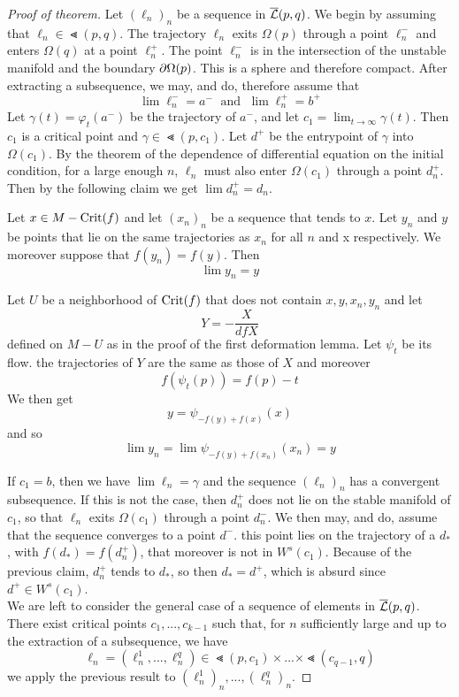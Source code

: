 \begin{proof}[Proof of theorem]
    Let $(\ell_n)_n$ be a sequence in ${\overline{\mathcal{L}} }(p, q)$.
    We begin by assuming that $\ell_n \in \Lt(p, q)$. The trajectory $\ell_n$ exits 
    $\Omega(p)$ through a point $\ell_n^-$ and enters $\Omega(q)$ at a point $\ell_n^+$.
    The point $\ell_n^-$ is in the intersection of the unstable manifold and the boundary
    ${ \partial } \Omega (p)$. This is a sphere and therefore compact. After extracting a 
    subsequence, we may, and do, therefore assume that
    \[ \lim \ell_n^- = a^- \; \text{ and } \; \lim \ell_n^+ = b^+ \]
    Let $\gamma(t) = \varphi_t(a^-)$ be the trajectory of $a^-$, and let 
    $c_1 = \lim_{t \to \infty} \gamma(t)$. Then $c_1$ is a critical point and 
    $\gamma \in \Lt (p, c_1)$. Let $d^+$ be the entrypoint of $\gamma$ into
    $\Omega (c_1)$. By the theorem of the dependence of differential equation on the 
    initial condition, for a large enough $n$, $\ell_n$ must also enter $\Omega(c_1)$
    through a point $d_n^+$. Then by the following claim we get $\lim d_n^+ = d_n$.
    \begin{claim*}
        Let $x \in M - { \operatorname{Crit} } (f)$ and let $(x_n)_n$ be a sequence that tends to $x$.
        Let $y_n$ and $y$ be points that lie on the same trajectories as $x_n$ for all
        $n$ and x respectively. We moreover suppose that $f(y_n) = f(y)$. Then 
        \[ \lim y_n = y \]
    \end{claim*}
    \begin{smallproof}
        Let $U$ be a neighborhood of ${ \operatorname{Crit} } (f)$ that does not contain 
        $x, y, x_n, y_n$ and let 
        \[ Y = - \frac{X}{dfX} \]
        defined on $M - U$ as in the proof of the first deformation lemma. Let 
        $\psi_t$ be its flow. the trajectories of $Y$ are the same as those of $X$
        and moreover 
        \[ f(\psi_t(p)) = f(p) - t \]
        We then get
        \[ y = \psi_{- f(y) + f(x)}(x)\]
        and so
        \[ \lim y_n = \lim \psi_{-f(y) + f(x_n)} (x_n) = y \]
    \end{smallproof}
    If $c_1 = b$, then we have $\lim \ell_n = \gamma$ and the sequence $(\ell_n)_n$ has a 
    convergent subsequence. If this is not the case, then $d_n^+$ does not lie on
    the stable manifold of $c_1$, so that $\ell_n$ exits $\Omega (c_1)$ through a point
    $d_n^-$. We then may, and do, assume that the sequence converges to a point 
    $d^-$. this point lies on the trajectory of a $d_{\ast}$, with 
    $f(d_{\ast}) = f(d_n^+)$, that moreover is not in $W^s (c_1)$. Because of the 
    previous claim, $d_n^+$ tends to $d_{\ast}$, so then $d_{\ast} = d^+$, which is
    absurd since $d^+ \in W^s(c_1)$. \\
    We are left to consider the general case of a sequence of elements in ${\overline{\mathcal{L}} } (p, q)$.
    There exist critical points $c_1, ..., c_{k - 1}$ such that, for $n$ sufficiently
    large and up to the extraction of a subsequence, we have
    \[ \ell_n = (\ell^1_n, ..., \ell^q_n) \in \Lt(p, c_1) \times ... \times \Lt(c_{q - 1}, q) \]
    we apply the previous result to $(\ell^1_n)_n, ..., (\ell^q_n)_n$.
\end{proof}

